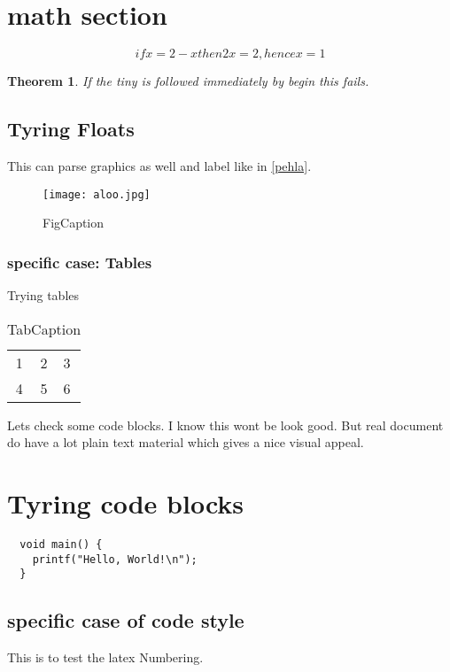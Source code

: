 \documentclass[master.tex]{subfiles}
\newtheorem{theorem}{Theorem}[section]
\begin{document}
  \section{math section}
  \begin{equation}
  if x = 2 - x then 2x = 2, hence x = 1
  \end{equation}

  {\tiny\begin{theorem}
  If the \emph{tiny} is followed immediately by begin this fails.
  \end{theorem}
  }

  \subsection{Tyring Floats}
  This can parse graphics as well and label like in \ref{pehla}.
  \begin{figure}[h]
      \centering
      \texttt{[image: aloo.jpg]}
      \caption{FigCaption}
      \label{fig:my_label}
  \end{figure}

  \subsubsection{specific case: Tables}
  Trying tables
  \begin{table}[]
      \centering
      \begin{tabular}{c|c}
          1 & 2 & 3 \\
          4 & 5 & 6
      \end{tabular}
      \caption{TabCaption}
      \label{tab:my_label}
  \end{table}

  Lets check some code blocks. I know this wont be look good. But real document
  do have a lot plain text material which gives a nice visual appeal.

\section{Tyring code blocks}
  \begin{lstlisting}
  void main() {
    printf("Hello, World!\n");
  }
  \end{lstlisting}

  \subsection{specific case of code style}
  This is to test the latex Numbering.
\end{document}
